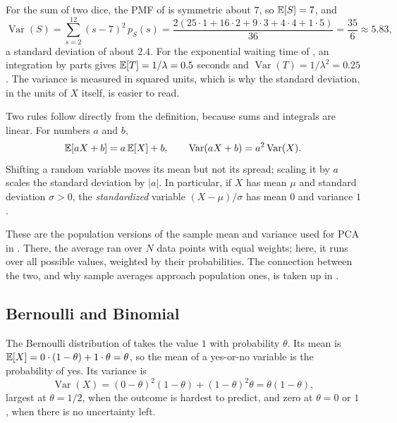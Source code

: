 For the sum of two dice, the PMF of  is symmetric
about $7$, so $\mathbb{E}[S] = 7$, and
\[
  \operatorname{Var}(S) = \sum_{s=2}^{12} (s - 7)^2\, p_S(s)
  = \frac{2(25 \cdot 1 + 16 \cdot 2 + 9 \cdot 3 + 4 \cdot 4 + 1 \cdot 5)}{36}
  = \frac{35}{6} \approx 5.83 ,
\]
a standard deviation of about $2.4$. For the exponential waiting time of
, an integration by parts gives $\mathbb{E}[T] =
1/\lambda = 0.5$ seconds and $\operatorname{Var}(T) = 1/\lambda^2 =
0.25$. The variance is measured in squared units, which is why the
standard deviation, in the units of $X$ itself, is easier to read.

Two rules follow directly from the definition, because sums and
integrals are linear. For numbers $a$ and $b$,
\begin{equation}
  \mathbb{E}[aX + b] = a\,\mathbb{E}[X] + b,
  \qquad
  \operatorname{Var}(aX + b) = a^2 \operatorname{Var}(X) .
  \label{eq:ch05-affine-moments}
\end{equation}
Shifting a random variable moves its mean but not its spread; scaling it
by $a$ scales the standard deviation by $|a|$. In particular, if $X$ has
mean $\mu$ and standard deviation $\sigma > 0$, the \emph{standardized}
variable $(X - \mu)/\sigma$ has mean $0$ and variance $1$.

These are the population versions of the sample mean and variance used
for PCA in . There, the average ran over $N$
data points with equal weights; here, it runs over all possible values,
weighted by their probabilities. The connection between the two, and
why sample averages approach population ones, is taken up in
.

\subsection{Bernoulli and Binomial}
\label{sec:ch05-binomial}

The Bernoulli distribution of  takes the value
$1$ with probability $\theta$. Its mean is $\mathbb{E}[X] = 0 \cdot (1 - \theta)
+ 1 \cdot \theta = \theta$, so the mean of a yes-or-no variable is the
probability of yes. Its variance is
\[
  \operatorname{Var}(X) = (0 - \theta)^2 (1 - \theta) + (1 - \theta)^2
  \theta = \theta(1 - \theta),
\]
largest at $\theta = 1/2$, when the outcome is hardest to predict, and
zero at $\theta = 0$ or $1$, when there is no uncertainty left.

